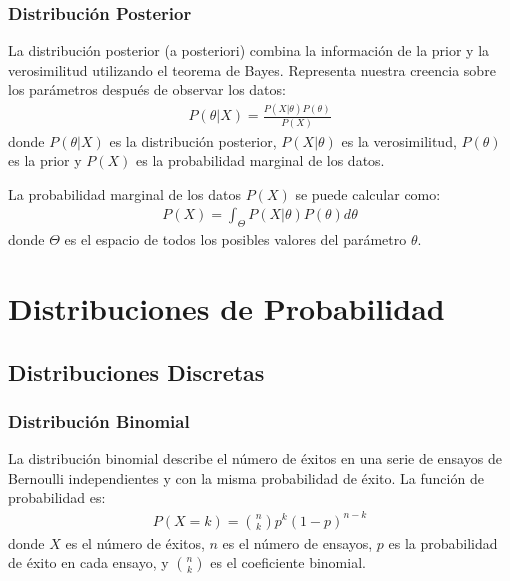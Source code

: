 \documentclass[a4paper]{report} %
\begin{document}
\subsubsection{Distribuci\'on Posterior}
La distribuci\'on posterior (a posteriori) combina la informaci\'on de la prior y la verosimilitud utilizando el teorema de Bayes. Representa nuestra creencia sobre los par\'ametros despu\'es de observar los datos:
\begin{eqnarray*}
P(\theta|X) = \frac{P(X|\theta)P(\theta)}{P(X)}
\end{eqnarray*}
donde $P(\theta|X)$ es la distribuci\'on posterior, $P(X|\theta)$ es la verosimilitud, $P(\theta)$ es la prior y $P(X)$ es la probabilidad marginal de los datos.

La probabilidad marginal de los datos $P(X)$ se puede calcular como:
\begin{eqnarray*}
P(X) = \int_{\Theta} P(X|\theta)P(\theta) d\theta
\end{eqnarray*}
donde $\Theta$ es el espacio de todos los posibles valores del par\'ametro $\theta$.

\section{Distribuciones de Probabilidad}
\subsection{Distribuciones Discretas}
\subsubsection{Distribuci\'on Binomial}
La distribuci\'on binomial describe el n\'umero de \'exitos en una serie de ensayos de Bernoulli independientes y con la misma probabilidad de \'exito. La funci\'on de probabilidad es:
\begin{eqnarray*}
P(X = k) = \binom{n}{k} p^k (1-p)^{n-k}
\end{eqnarray*}
donde $X$ es el n\'umero de \'exitos, $n$ es el n\'umero de ensayos, $p$ es la probabilidad de \'exito en cada ensayo, y $\binom{n}{k}$ es el coeficiente binomial.
\end{document}
